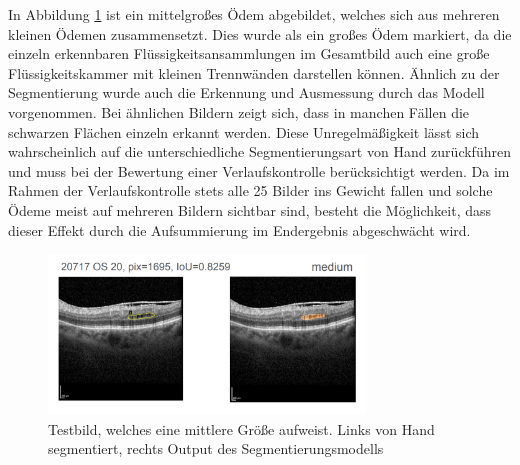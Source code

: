 In Abbildung \ref{fig:ergebnis_good2} ist ein mittelgroßes Ödem abgebildet, welches sich aus mehreren kleinen Ödemen zusammensetzt. Dies wurde als ein großes Ödem markiert, da die einzeln erkennbaren Flüssigkeitsansammlungen im Gesamtbild auch eine große Flüssigkeitskammer mit kleinen Trennwänden darstellen können. Ähnlich zu der Segmentierung wurde auch die Erkennung und Ausmessung durch das Modell vorgenommen. Bei ähnlichen Bildern zeigt sich, dass in manchen Fällen die schwarzen Flächen einzeln erkannt werden. Diese Unregelmäßigkeit lässt sich wahrscheinlich auf die unterschiedliche Segmentierungsart von Hand zurückführen und muss bei der Bewertung einer Verlaufskontrolle berücksichtigt werden. Da im Rahmen der Verlaufskontrolle stets alle 25 Bilder ins Gewicht fallen und solche Ödeme meist auf mehreren Bildern sichtbar sind, besteht die Möglichkeit, dass dieser Effekt durch die Aufsummierung im Endergebnis abgeschwächt wird.\newline
\begin{figure}[h]
\centering
\includegraphics[width=0.75\textwidth]{./pic/Segmentierung/Segmentierungsergebnisse/38.PNG}
\caption{\label{fig:ergebnis_good2}Testbild, welches eine mittlere Größe aufweist. Links von Hand segmentiert, rechts Output des Segmentierungsmodells}
\end{figure}

